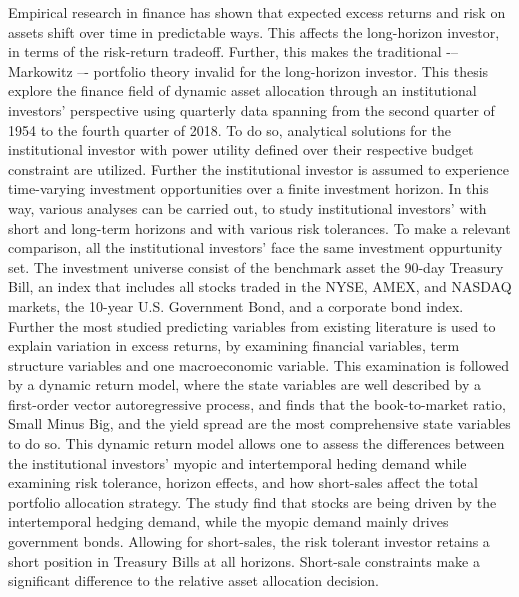 \documentclass[
  a4paper,
  oneside]{memoir}
\begin{document}
\begin{titlingpage}
\begin{center}
\begin{minipage}{16cm}
Empirical research in finance has shown that expected excess returns and risk
on assets shift over time in predictable ways. This affects the long-horizon investor, in terms of the risk-return tradeoff. Further, this makes the traditional -– Markowitz –- portfolio theory invalid for the long-horizon investor. This thesis explore the finance field of dynamic asset allocation through an institutional investors' perspective using quarterly data spanning from the second quarter of 1954 to the fourth quarter of 2018. To do so, analytical solutions for the institutional investor with power utility defined over their respective budget constraint are utilized. Further the institutional investor is assumed to experience time-varying investment opportunities over a finite investment horizon. In this way, various analyses can be carried out, to study institutional investors' with short and long-term horizons and with various risk tolerances. To make a relevant comparison, all the institutional investors' face the same investment oppurtunity set. The investment universe consist of the benchmark asset the 90-day Treasury Bill, an index that includes all stocks traded in the NYSE, AMEX, and NASDAQ markets, the 10-year U.S. Government Bond, and a corporate bond index. Further the most studied predicting variables from existing literature is used to explain variation in excess returns, by examining financial variables, term structure variables and one macroeconomic variable. This examination is followed by a dynamic return model, where the state variables are well described by a first-order vector autoregressive process, and finds that the book-to-market ratio, Small Minus Big, and the yield spread are the most comprehensive state variables to do so. This dynamic return model allows one to assess the differences between the institutional investors' myopic and intertemporal heding demand while examining risk tolerance, horizon effects, and how short-sales affect the total portfolio allocation strategy. The study find that stocks are being driven by the intertemporal hedging demand, while the myopic demand mainly drives government bonds. Allowing for short-sales, the risk tolerant investor retains a short position in Treasury Bills at all horizons. Short-sale constraints make a significant difference to the relative asset allocation decision.
\end{minipage}
\end{center}
\end{titlingpage}
\end{document}
